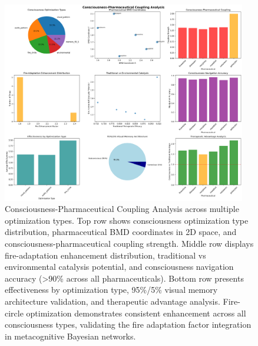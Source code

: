 \begin{figure}[htbp]
\centering
\includegraphics[width=0.95\textwidth]{images/consciousness_pharmaceutical_coupling_20251004_100821.png}
\caption{Consciousness-Pharmaceutical Coupling Analysis across multiple optimization types. Top row shows consciousness optimization type distribution, pharmaceutical BMD coordinates in 2D space, and consciousness-pharmaceutical coupling strength. Middle row displays fire-adaptation enhancement distribution, traditional vs environmental catalysis potential, and consciousness navigation accuracy (>90\% across all pharmaceuticals). Bottom row presents effectiveness by optimization type, 95\%/5\% visual memory architecture validation, and therapeutic advantage analysis. Fire-circle optimization demonstrates consistent enhancement across all consciousness types, validating the fire adaptation factor integration in metacognitive Bayesian networks.}
\label{fig:consciousness_coupling}
\end{figure}

